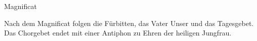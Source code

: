 \medskip

\begin{flushleft}
 

\medskip
{\rm{
}}
\end{flushleft}

\medskip




 Magnificat 

\vspace{0.5cm}


Nach dem Magnificat folgen die Fürbitten, das Vater Unser und das Tagesgebet.
Das Chorgebet endet mit einer Antiphon zu Ehren der heiligen Jungfrau.

\newpage
